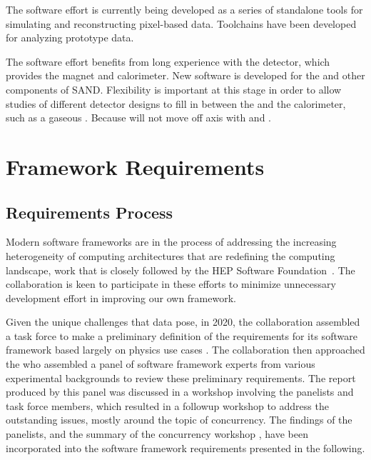 \documentclass[../main-v1.tex]{subfiles}
\begin{document}
The  software effort is currently being developed as a series of standalone tools for simulating and reconstructing pixel-based  data.  Toolchains have been developed for analyzing  prototype data.

The  software effort benefits from long experience with the  detector, which provides the magnet and calorimeter.  New software is developed for the  and other components of SAND.  Flexibility is important at this stage in order to allow studies of different detector designs to fill in between the  and the calorimeter, such as a gaseous .  Because  will not move off axis with  and .


\section{Framework Requirements }
\subsection{Requirements Process} %
Modern  software frameworks are in the process of addressing the increasing heterogeneity of computing architectures that are redefining the computing landscape, work that is closely followed by the HEP Software Foundation~\cite{Alves:2017she, Calafiura:2018rwe}. The  collaboration is keen to participate in these efforts to minimize unnecessary development effort in improving our own framework. 

Given the unique challenges that  data pose, in 2020, the collaboration assembled a task force to make a preliminary definition of the requirements for its software framework based largely on physics use cases \cite{bib:docdb21934}.  The collaboration then approached the  who assembled a panel of software framework experts from various experimental backgrounds to review these preliminary requirements. The report \cite{bib:docdb24423} produced by this panel was discussed in a workshop involving the panelists and task force members, which resulted in a followup workshop to address the outstanding issues, mostly around the topic of concurrency.  The findings of the panelists, and the summary of the concurrency workshop \cite{bib:docdb24426}, have been incorporated into the  software framework requirements presented in the following.
\end{document}
